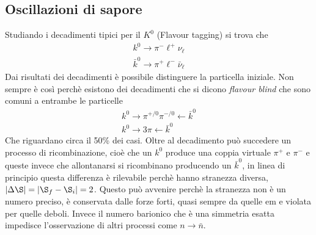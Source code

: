 \documentclass[12pt]{book}
\begin{document}
\subsection{Oscillazioni di sapore}
Studiando i decadimenti tipici per il $K^0$ (Flavour tagging) si trova che
\begin{gather}
	k^0 \rightarrow \pi^- \ell^+ \nu_\ell\\
	\bar k^0 \rightarrow \pi^+ \ell^- \bar \nu_\ell
\end{gather}
Dai risultati dei decadimenti è possibile distinguere la particella iniziale. Non sempre è così perchè esistono dei decadimenti che si dicono \textit{flavour blind} che sono comuni a entrambe le particelle
\begin{gather}
	k^0 \rightarrow \pi^{+/0} \pi^{-/0} \leftarrow \bar k^0\\
	k^0 \rightarrow 3 \pi \leftarrow \bar k^0
\end{gather}
Che riguardano circa il 50\% dei casi. Oltre al decadimento può succedere un processo di ricombinazione, cioè che un $k^0$ produce una coppia virtuale $\pi^+$ e $\pi^-$ e queste invece che allontanarsi si ricombinano producendo un $\bar k^0$, in linea di principio questa differenza è rilevabile perchè hanno stranezza diversa, $|\Delta \S| = |\S_f - \S_i| =2$. Questo può avvenire perchè la stranezza non è un numero preciso, è conservata dalle forze forti, quasi sempre da quelle em e violata per quelle deboli. Invece il numero barionico che è una simmetria esatta impedisce l'osservazione di altri processi come $n \rightarrow \bar n$.
\end{document}
